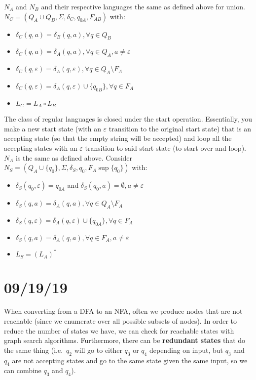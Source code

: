 \documentclass[12 pt]{article}
\begin{document}
$N_A$ and $N_B$ and their respective languages the same as defined
above for union.
\\ $N_C = (Q_A \cup Q_B, \Sigma, \delta_C, q_{0A}, F_{AB})$ with:
\begin{itemize}
\item $\delta_C(q,a) = \delta_B (q,a), \forall q \in Q_B$
\item $\delta_C(q,a) = \delta_A (q,a), \forall q \in Q_A, a \neq
  \varepsilon$
\item $\delta_C(q,\varepsilon) = \delta_A(q, \varepsilon), \forall q
  \in Q_A \setminus F_A$
\item $\delta_C(q,\varepsilon) = \delta_A (q,\varepsilon) \cup
  \{q_{0B}\}, \forall q \in F_A$
\item $L_C = L_A \circ L_B$
\end{itemize}

The class of regular languages is closed under the start
operation. Essentially, you make a new start state (with an
$\varepsilon$ transition to the original start state) that is an
accepting state (so that the empty string will be accepted) and loop
all the accepting states with an $\varepsilon$ transition to said
start state (to start over and loop).
\\ $N_A$ is the same as defined above. Consider $N_S = (Q_A \cup
\{q_0\}, \Sigma, \delta_S, q_0, F_A \sup \{q_0\})$ with:
\begin{itemize}
\item $\delta_S(q_0, \varepsilon) = q_{0A}$ and $\delta_S(q_0,a) =
  \emptyset, a \neq \varepsilon$
\item $\delta_S(q,a) = \delta_A(q,a), \forall q \in Q_A\setminus F_A$
\item $\delta_S(q,\varepsilon) = \delta_A(q,\varepsilon) \cup
  \{q_{0A}\}, \forall q \in F_A$
\item $\delta_S(q,a) = \delta_A(q,a), \forall q \in F_A, a \neq
  \varepsilon$
\item $L_S = (L_A)^*$
\end{itemize}
\section{09/19/19}
When converting from a DFA to an NFA, often we produce nodes that are
not reachable (since we enumerate over all possible subsets of
nodes). In order to reduce the number of states we have, we can check
for reachable states with graph search algorithms. Furthermore, there
can be \textbf{redundant states} that do the same thing (i.e.\ $q_2$
will go to either $q_3$ or $q_4$ depending on input, but $q_3$ and
$q_4$ are not accepting states and go to the same state given the same
input, so we can combine $q_3$ and $q_4$).
\end{document}

